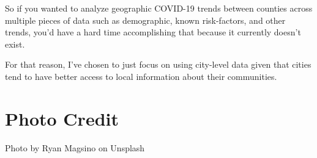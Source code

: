\documentclass[
]{report}
\begin{document}
So if you wanted to analyze geographic COVID-19 trends between counties
across multiple pieces of data such as demographic, known risk-factors,
and other trends, you'd have a hard time accomplishing that because it
currently doesn't exist.

For that reason, I've chosen to just focus on using city-level data
given that cities tend to have better access to local information about
their communities.

\hypertarget{photo-credit}{%
\chapter{Photo Credit}\label{photo-credit}}

Photo by Ryan Magsino on Unsplash
\end{document}
